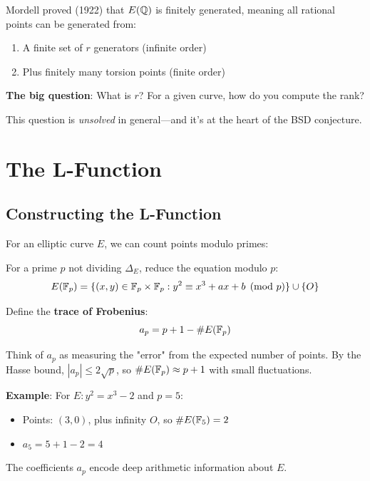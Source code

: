 \begin{keyidea}
Mordell proved (1922)\cite{mordell1922rational} that $E(\mathbb{Q})$ is finitely generated, meaning all rational points can be generated from:
\begin{enumerate}
\item A finite set of $r$ generators (infinite order)
\item Plus finitely many torsion points (finite order)
\end{enumerate}

\textbf{The big question}: What is $r$? For a given curve, how do you compute the rank?

This question is \textit{unsolved} in general—and it's at the heart of the BSD conjecture.
\end{keyidea}

\section{The L-Function}

\subsection{Constructing the L-Function}

For an elliptic curve $E$, we can count points modulo primes:

\begin{defn}\label{def:reduction-mod-p}
For a prime $p$ not dividing $\Delta_E$, reduce the equation modulo $p$:
\begin{equation}
E(\mathbb{F}_p) = \{(x, y) \in \mathbb{F}_p \times \mathbb{F}_p : y^2 \equiv x^3 + ax + b \pmod{p}\} \cup \{O\}
\end{equation}

Define the \textbf{trace of Frobenius}:
\begin{equation}
a_p = p + 1 - \#E(\mathbb{F}_p)
\end{equation}
\end{defn}

\begin{intuitive}
Think of $a_p$ as measuring the "error" from the expected number of points. By the Hasse bound, $|a_p| \leq 2\sqrt{p}$, so $\#E(\mathbb{F}_p) \approx p + 1$ with small fluctuations.

\textbf{Example}: For $E: y^2 = x^3 - 2$ and $p = 5$:
\begin{itemize}
\item Points: $(3,0)$, plus infinity $O$, so $\#E(\mathbb{F}_5) = 2$
\item $a_5 = 5 + 1 - 2 = 4$
\end{itemize}

The coefficients $a_p$ encode deep arithmetic information about $E$.
\end{intuitive}


